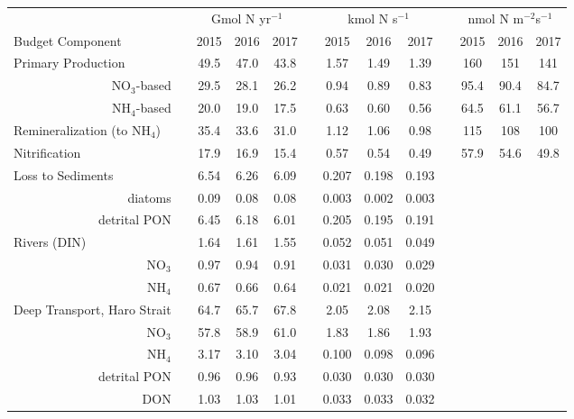    \small
   \centering
   \begin{tabular}{lrcccccccccccc}\toprule
      &  &  & \multicolumn{3}{c}{ Gmol N yr$^{-1}$ } &  & \multicolumn{3}{c}{ kmol N s$^{-1}$ }  &  & \multicolumn{3}{c}{ nmol N m$^{-2}$s$^{-1}$ } \\
    \multicolumn{2}{l}{ Budget Component }  & \phantom{a}  & 2015 & 2016 & 2017& \phantom{a}  & 2015 & 2016 & 2017& \phantom{a}  & 2015 & 2016 & 2017 \\ \midrule
     \multicolumn{2}{l}{ Primary Production } & & 49.5 & 47.0 & 43.8  & & 1.57 & 1.49 & 1.39 & & 160 & 151 & 141 \\
       &       NO$_3$-based & & 29.5 & 28.1 & 26.2 & & 0.94 & 0.89 & 0.83 & & 95.4 & 90.4 & 84.7 \\
       &       NH$_4$-based & & 20.0 & 19.0 & 17.5 & & 0.63 & 0.60 & 0.56 & & 64.5 & 61.1 & 56.7 \\
     \multicolumn{2}{l}{ Remineralization (to NH$_4$) } & & 35.4 & 33.6 & 31.0  & & 1.12 & 1.06 & 0.98 & & 115 & 108 & 100 \\
     \multicolumn{2}{l}{ Nitrification } & & 17.9 & 16.9 & 15.4  & & 0.57 & 0.54 & 0.49 & & 57.9 & 54.6 & 49.8 \\
     \multicolumn{2}{l}{ Loss to Sediments } & & 6.54 & 6.26 & 6.09 & & 0.207 & 0.198 & 0.193 & &  &  &  \\
       &       diatoms & & 0.09 & 0.08 & 0.08 & & 0.003 & 0.002 & 0.003 & &  &  &  \\
       &       detrital PON & & 6.45 & 6.18 & 6.01 & & 0.205 & 0.195 & 0.191 & &  &  &  \\
     \multicolumn{2}{l}{ Rivers (DIN) } & & 1.64 & 1.61 & 1.55 & & 0.052 & 0.051 & 0.049 & &  &  &  \\
       & NO$_3$ & & 0.97 & 0.94 & 0.91 & & 0.031 & 0.030 & 0.029 & &  &  &  \\
       & NH$_4$ & & 0.67 & 0.66 & 0.64 & & 0.021 & 0.021 & 0.020 & &  &  &  \\
     \multicolumn{2}{l}{ Deep Transport, Haro Strait } & & 64.7 & 65.7 & 67.8  & & 2.05 & 2.08 & 2.15 & &  &  &  \\
       & NO$_3$ & & 57.8 & 58.9 & 61.0 & & 1.83 & 1.86 & 1.93 & &  &  &  \\
       & NH$_4$ & & 3.17 & 3.10 & 3.04 & & 0.100 & 0.098 & 0.096 & &  &  &  \\
       & detrital PON & & 0.96 & 0.96 & 0.93 & & 0.030 & 0.030 & 0.030 & &  &  &  \\
       & DON & & 1.03 & 1.03 & 1.01 & & 0.033 & 0.033 & 0.032 & &  &  &  \\

\end{tabular}
